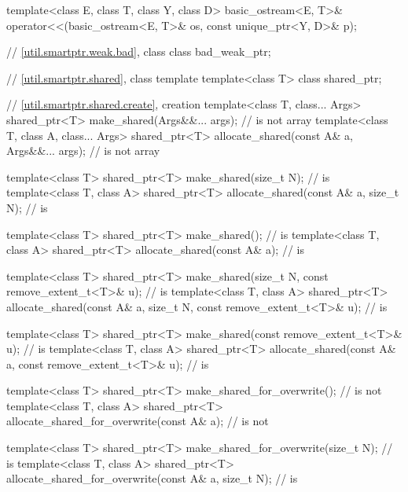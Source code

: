 \begin{codeblock}
{  template<class E, class T, class Y, class D>
    basic_ostream<E, T>& operator<<(basic_ostream<E, T>& os, const unique_ptr<Y, D>& p);

  // \ref{util.smartptr.weak.bad}, class 
  class bad_weak_ptr;

  // \ref{util.smartptr.shared}, class template 
  template<class T> class shared_ptr;

  // \ref{util.smartptr.shared.create},  creation
  template<class T, class... Args>
    shared_ptr<T> make_shared(Args&&... args);                                  //  is not array
  template<class T, class A, class... Args>
    shared_ptr<T> allocate_shared(const A& a, Args&&... args);                  //  is not array

  template<class T>
    shared_ptr<T> make_shared(size_t N);                                        //  is 
  template<class T, class A>
    shared_ptr<T> allocate_shared(const A& a, size_t N);                        //  is 

  template<class T>
    shared_ptr<T> make_shared();                                                //  is 
  template<class T, class A>
    shared_ptr<T> allocate_shared(const A& a);                                  //  is 

  template<class T>
    shared_ptr<T> make_shared(size_t N, const remove_extent_t<T>& u);           //  is 
  template<class T, class A>
    shared_ptr<T> allocate_shared(const A& a, size_t N,
                                  const remove_extent_t<T>& u);                 //  is 

  template<class T>
    shared_ptr<T> make_shared(const remove_extent_t<T>& u);                     //  is 
  template<class T, class A>
    shared_ptr<T> allocate_shared(const A& a, const remove_extent_t<T>& u);     //  is 

  template<class T>
    shared_ptr<T> make_shared_for_overwrite();                                  //  is not 
  template<class T, class A>
    shared_ptr<T> allocate_shared_for_overwrite(const A& a);                    //  is not 

  template<class T>
    shared_ptr<T> make_shared_for_overwrite(size_t N);                          //  is 
  template<class T, class A>
    shared_ptr<T> allocate_shared_for_overwrite(const A& a, size_t N);          //  is 

}
\end{codeblock}
